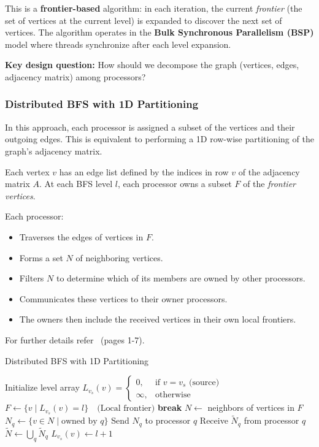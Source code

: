 \documentclass[12pt]{book}
\begin{document}
This is a \textbf{frontier-based} algorithm: in each iteration, the current \textit{frontier} (the set of vertices at the current level) is expanded to discover the next set of vertices. The algorithm operates in the \textbf{Bulk Synchronous Parallelism (BSP)} model where threads synchronize after each level expansion.

\medskip
\noindent
\textbf{Key design question:} How should we decompose the graph (vertices, edges, adjacency matrix) among processors?

\subsubsection{Distributed BFS with 1D Partitioning}

In this approach, each processor is assigned a subset of the vertices and their outgoing edges. This is equivalent to performing a 1D row-wise partitioning of the graph’s adjacency matrix.

Each vertex $v$ has an edge list defined by the indices in row $v$ of the adjacency matrix $A$. At each BFS level $l$, each processor owns a subset $F$ of the \textit{frontier vertices}.

Each processor:
\begin{itemize}
    \item Traverses the edges of vertices in $F$.
    \item Forms a set $N$ of neighboring vertices.
    \item Filters $N$ to determine which of its members are owned by other processors.
    \item Communicates these vertices to their owner processors.
    \item The owners then include the received vertices in their own local frontiers.
\end{itemize}
For further details refer~\cite{yoo2005scalable} (pages 1-7).
\begin{algorithm}[H]
\caption{Distributed BFS with 1D Partitioning}
\label{alg:1DBFS}
\begin{algorithmic}[1]
\State Initialize level array $L_{v_s}(v) = \begin{cases}
    0, & \text{if } v = v_s \text{ (source)} \\
    \infty, & \text{otherwise}
\end{cases}$
    \State $F \gets \{v \mid L_{v_s}(v) = l\} \quad \text{(Local frontier)}$
        \State \textbf{break} 
    \EndIf
    \State $N \gets$ neighbors of vertices in $F$
        \State $N_q \gets \{v \in N \mid \text{owned by } q\}$
        \State Send $N_q$ to processor $q$
        \State Receive $\tilde{N}_q$ from processor $q$
    \EndFor
    \State $\tilde{N} \gets \bigcup_q \tilde{N}_q$ 
        \State $L_{v_s}(v) \gets l + 1$
    \EndFor
\EndFor
\end{algorithmic}
\end{algorithm}
\end{document}

